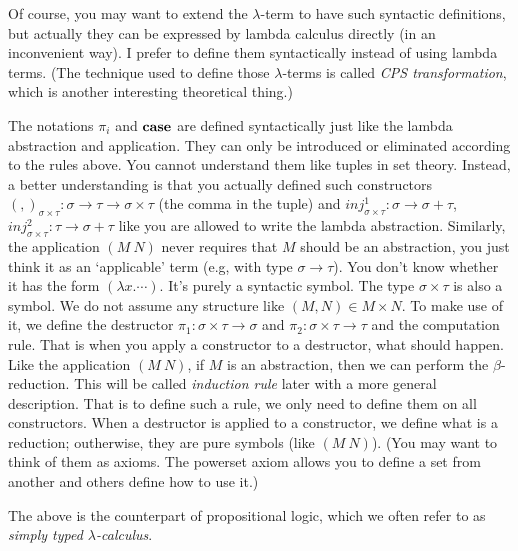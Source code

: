 Of course, you may want to extend the $\lambda$-term to have such
syntactic definitions, but actually they can be expressed by lambda
calculus directly \cite{Curry-Howard} (in an inconvenient way). 
I prefer to define them syntactically instead of using lambda terms.
(The technique used to define those $\lambda$-terms is called {\it CPS 
transformation}, which is another interesting theoretical thing.)

\begin{caveat}
    \label{constructor-destructor}
    The notations $\pi_i$ and $\text{\bf case}$ are defined syntactically
    just like the lambda abstraction and application. They can only be
    introduced or eliminated according to the rules above. You cannot
    understand them like tuples in set theory. Instead, a better
    understanding is that you actually defined such constructors 
    $(,)_{\sigma\times\tau}: \sigma\to\tau\to\sigma\times\tau$ (the comma
    in the tuple) and $inj^1_{\sigma\times\tau}: \sigma\to\sigma+\tau$, 
    $inj^2_{\sigma\times\tau}: \tau\to\sigma+\tau$ like you are allowed
    to write the lambda abstraction. Similarly, the application $(M\ N)$
    never requires that $M$ should be an abstraction, you just think it 
    as an `applicable' term (e.g, with type $\sigma\to\tau$). You don't 
    know whether it has the form $(\lambda x.\cdots)$. It's purely a
    syntactic symbol. The type $\sigma\times\tau$ is also a symbol. We
    do not assume any structure like $(M, N)\in M\times N$. To make
    use of it, we define the destructor $\pi_1:\sigma\times\tau\to\sigma$
    and $\pi_2:\sigma\times\tau\to\tau$ and the computation rule. That is
    when you apply a constructor to a destructor, what should happen.
    Like the application $(M\ N)$, if $M$ is an abstraction, then we can 
    perform the $\beta$-reduction. This will be called {\it induction 
    rule} later with a more general description. That is to define
    such a rule, we only need to define them on all constructors.
    When a destructor is applied to a constructor, we define what is a
    reduction; outherwise, they are pure symbols (like $(M\ N)$).
    (You may want to think of them as axioms. The powerset axiom allows 
    you to define a set from another and others define how to use it.)
\end{caveat}

The above is the counterpart of propositional logic, which we often
refer to as {\it simply typed $\lambda$-calculus}.

